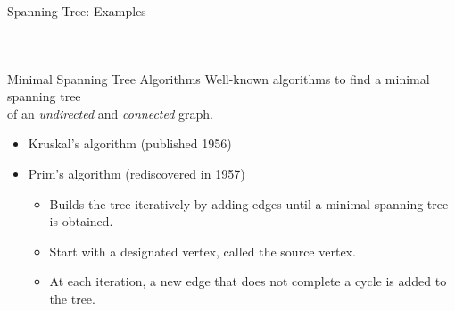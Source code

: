 \documentclass[14pt,aspectratio=1610]{beamer}
\begin{document}
\begin{frame}{Spanning Tree: Examples}
\begin{columns}
\begin{figure}
  \end{figure}
\end{columns}
%
%
%
\end{frame}

\begin{frame}{Minimal Spanning Tree Algorithms}
Well-known algorithms to find a minimal spanning tree \\of an \emph{undirected} and \emph{connected} graph.

\begin{itemize}
  \item
    Kruskal's algorithm (published 1956)
  \item
    Prim's algorithm (rediscovered in 1957)
    \begin{itemize}
    \item
      Builds the tree iteratively by adding edges until a minimal spanning tree is obtained.
    \item
      Start with a designated vertex, called the source vertex.
    \item
      At each iteration, a new edge that does not complete a cycle is added to the tree.
    \end{itemize}
\end{itemize}
\end{frame}
\end{document}
